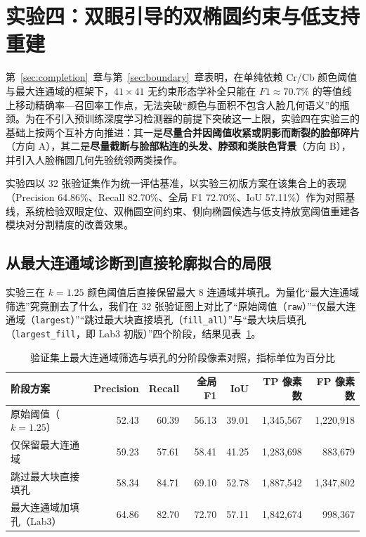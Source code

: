 \section{实验四：双眼引导的双椭圆约束与低支持重建}\label{sec:lab4}

第~\ref{sec:completion}~章与第~\ref{sec:boundary}~章表明，在单纯依赖 Cr/Cb 颜色阈值与最大连通域的框架下，$41\times41$ 无约束形态学补全只能在 $F1\approx70.7\%$ 的等值线上移动精确率—召回率工作点，无法突破“颜色与面积不包含人脸几何语义”的瓶颈。为在不引入预训练深度学习检测器的前提下突破这一上限，实验四在实验三的基础上按两个互补方向推进：其一是\textbf{尽量合并因阈值收紧或阴影而断裂的脸部碎片}（方向 A），其二是\textbf{尽量截断与脸部粘连的头发、脖颈和类肤色背景}（方向 B），并引入人脸椭圆几何先验统领两类操作。

实验四以 32 张验证集作为统一评估基准，以实验三初版方案在该集合上的表现（Precision 64.86\%、Recall 82.70\%、全局 F1 72.70\%、IoU 57.11\%）作为对照基线，系统检验双眼定位、双椭圆空间约束、侧向椭圆候选与低支持放宽阈值重建各模块对分割精度的改善效果。

\subsection{从最大连通域诊断到直接轮廓拟合的局限}

实验三在 $k=1.25$ 颜色阈值后直接保留最大 8 连通域并填孔。为量化“最大连通域筛选”究竟删去了什么，我们在 32 张验证图上对比了“原始阈值（\texttt{raw}）”“仅最大连通域（\texttt{largest}）”“跳过最大块直接填孔（\texttt{fill\_all}）”与“最大块后填孔（\texttt{largest\_fill}，即 Lab3 初版）”四个阶段，结果见表~\ref{tab:lab4_cc}。

\begin{table}[H]
\centering\small
\caption{验证集上最大连通域筛选与填孔的分阶段像素对照，指标单位为百分比}\label{tab:lab4_cc}
\begin{tabular}{lrrrrrr}
\toprule
阶段方案 & Precision & Recall & 全局 F1 & IoU & TP 像素数 & FP 像素数 \\
\midrule
原始阈值（$k=1.25$） & 52.43 & 60.39 & 56.13 & 39.01 & 1,345,567 & 1,220,918 \\
仅保留最大连通域 & 59.23 & 57.61 & 58.41 & 41.25 & 1,283,698 & 883,679 \\
跳过最大块直接填孔 & 58.34 & 84.71 & 69.10 & 52.78 & 1,887,542 & 1,347,802 \\
最大连通域加填孔（Lab3） & 64.86 & 82.70 & 72.70 & 57.11 & 1,842,674 & 998,367 \\
\bottomrule
\end{tabular}
\end{table}

